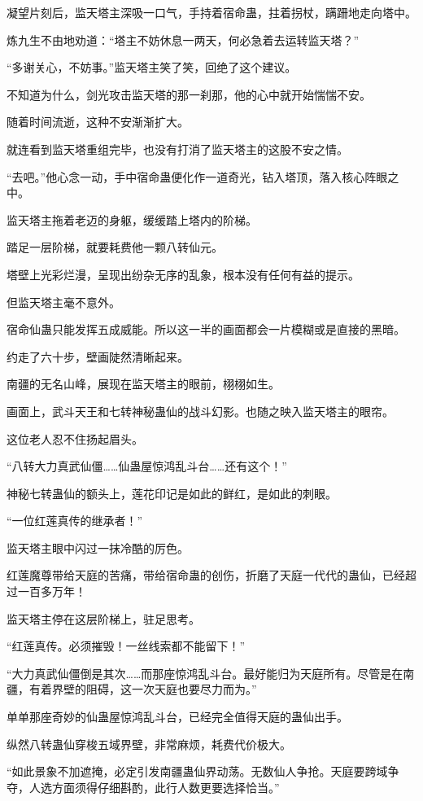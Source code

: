 \begin{this_body}
凝望片刻后，监天塔主深吸一口气，手持着宿命蛊，拄着拐杖，蹒跚地走向塔中。

炼九生不由地劝道：“塔主不妨休息一两天，何必急着去运转监天塔？”

“多谢关心，不妨事。”监天塔主笑了笑，回绝了这个建议。

不知道为什么，剑光攻击监天塔的那一刹那，他的心中就开始惴惴不安。

随着时间流逝，这种不安渐渐扩大。

就连看到监天塔重组完毕，也没有打消了监天塔主的这股不安之情。

“去吧。”他心念一动，手中宿命蛊便化作一道奇光，钻入塔顶，落入核心阵眼之中。

监天塔主拖着老迈的身躯，缓缓踏上塔内的阶梯。

踏足一层阶梯，就要耗费他一颗八转仙元。

塔壁上光彩烂漫，呈现出纷杂无序的乱象，根本没有任何有益的提示。

但监天塔主毫不意外。

宿命仙蛊只能发挥五成威能。所以这一半的画面都会一片模糊或是直接的黑暗。

约走了六十步，壁画陡然清晰起来。

南疆的无名山峰，展现在监天塔主的眼前，栩栩如生。

画面上，武斗天王和七转神秘蛊仙的战斗幻影。也随之映入监天塔主的眼帘。

这位老人忍不住扬起眉头。

“八转大力真武仙僵……仙蛊屋惊鸿乱斗台……还有这个！”

神秘七转蛊仙的额头上，莲花印记是如此的鲜红，是如此的刺眼。

“一位红莲真传的继承者！”

监天塔主眼中闪过一抹冷酷的厉色。

红莲魔尊带给天庭的苦痛，带给宿命蛊的创伤，折磨了天庭一代代的蛊仙，已经超过一百多万年！

监天塔主停在这层阶梯上，驻足思考。

“红莲真传。必须摧毁！一丝线索都不能留下！”

“大力真武仙僵倒是其次……而那座惊鸿乱斗台。最好能归为天庭所有。尽管是在南疆，有着界壁的阻碍，这一次天庭也要尽力而为。”

单单那座奇妙的仙蛊屋惊鸿乱斗台，已经完全值得天庭的蛊仙出手。

纵然八转蛊仙穿梭五域界壁，非常麻烦，耗费代价极大。

“如此景象不加遮掩，必定引发南疆蛊仙界动荡。无数仙人争抢。天庭要跨域争夺，人选方面须得仔细斟酌，此行人数更要选择恰当。”


\end{this_body}
